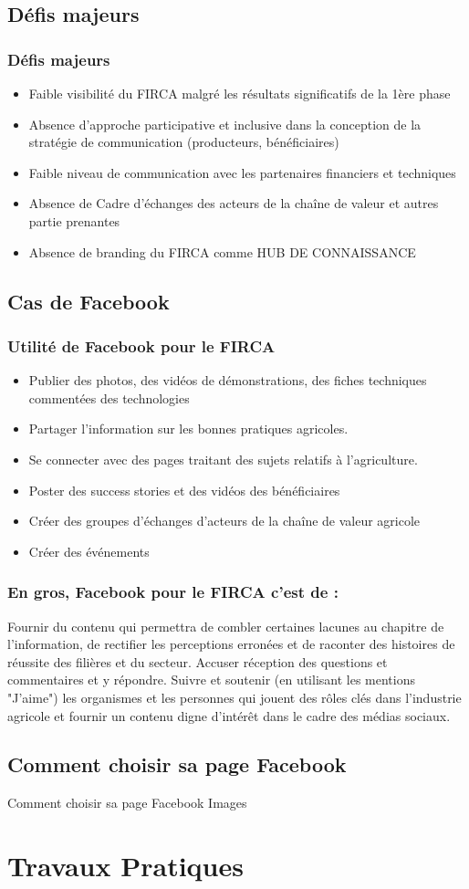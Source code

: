 \documentclass{beamer}
\begin{document}
\subsection{Défis majeurs}
\begin{frame}
\frametitle{Défis majeurs}
\begin{itemize}
\item Faible visibilité du FIRCA malgré les résultats significatifs de la 1ère phase
\item Absence d’approche participative et inclusive dans la conception de la stratégie de communication (producteurs, bénéficiaires)
\item Faible niveau de communication avec les partenaires financiers et techniques
\item Absence de Cadre d’échanges des acteurs de la chaîne de valeur et autres partie prenantes
\item Absence de branding du FIRCA comme HUB DE CONNAISSANCE
\end{itemize}
\end{frame}
\subsection{Cas de Facebook}
\begin{frame}
\frametitle{Utilité de Facebook pour le FIRCA}
\begin{itemize}
\item Publier des photos, des vidéos de démonstrations, des fiches techniques commentées des technologies 
\item Partager l'information sur les bonnes pratiques agricoles.
\item Se connecter avec des pages traitant des sujets relatifs à l'agriculture.
\item Poster des success stories et des vidéos des bénéficiaires 
\item Créer des groupes d'échanges d'acteurs de la chaîne de valeur agricole
\item Créer des événements 
\end{itemize}
\end{frame}
\begin{frame}
\frametitle{En gros, Facebook pour le FIRCA c'est de :}
Fournir du contenu qui permettra de combler certaines lacunes au chapitre de l’information, de rectifier les perceptions erronées et de raconter des histoires de réussite des filières et du secteur.
\newline \newline
Accuser réception des questions et commentaires et y répondre.
\newline \newline
Suivre et soutenir (en utilisant les mentions "J’aime") les organismes et les personnes qui jouent des rôles clés dans l’industrie agricole et fournir un contenu digne d’intérêt dans le cadre des médias sociaux.
\end{frame}
\subsection{Comment choisir sa page Facebook}
\begin{frame}{Comment choisir sa page Facebook}
    Images
\end{frame}


\section{Travaux Pratiques}
\end{document}
